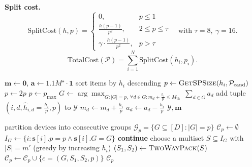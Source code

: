 \vspace{0.5em}
\noindent\textbf{Split cost.}
\[
\mathrm{SplitCost}(h,p)=
\begin{cases}
0, & p\le 1\\
\frac{h(p-1)}{p^2}, & 2\le p\le \tau\\
\gamma\cdot\frac{h(p-1)}{p^2}, & p>\tau
\end{cases}
\quad\text{with }\tau=8,\ \gamma=16.
\]
\[
\mathrm{TotalCost}(\mathcal{P})=\sum_{i=1}^N \mathrm{SplitCost}(h_i,p_i).
\]
\begin{algorithm}
\caption{FlexUlysses Sub-procedures}
\label{alg:subprocedures}
\begin{algorithmic}[1]
\State $\mathbf{m}\gets \mathbf{0}$, \quad $\mathbf{a}\gets 1.1 M^\star\cdot \mathbf{1}$ 
\State sort items by $h_i$ descending
  \State $p \gets \Call{GetSPSize}{h_i,\mathcal{P}_{\mathrm{cand}}}$ 
    \State $p \gets 2p$
  \EndWhile
   \State $p\gets p_{\max}$ \EndIf
  \State $G \gets \arg\max_{G:|G|=p,\ \forall d\in G: m_d+\frac{h_i}{p}\le M_{\mathrm{th}}}\ \sum_{d\in G} a_d$
    \State add tuple $(i,d,\hat h_{i,d}\!=\!\frac{h_i}{p},p)$ to $\mathcal{Y}$
    \State $m_d \gets m_d + \frac{h_i}{p}$
    \State $a_d \gets a_d - \frac{h_i}{p}$ 
  \EndFor
\EndFor
\State \Return $\mathcal{Y},\mathbf{m}$
\EndProcedure

\vspace{0.3em}
\Statex
{}
\State partition devices into consecutive groups $\mathcal{G}_p=\{G\subseteq [D]: |G|=p\}$
\State $\mathcal{C}_p\gets \emptyset$
  \State $I_G \gets \{i:\mathbf{s}[i].p=p \wedge \mathbf{s}[i].G=G\}$
   \State \textbf{continue} \EndIf
    \State choose a multiset $S\subseteq I_G$ with $|S|=m'$ (greedy by increasing $h_i$)
    \State $(S_1,S_2)\gets \Call{TwoWayPack}{S}$ 
      \State $\mathcal{C}_p \gets \mathcal{C}_p \cup \{c=(G,S_1,S_2,p)\}$
    \EndIf
  \EndFor
\EndFor
\State \Return $\mathcal{C}_p$
\EndProcedure


\end{algorithmic}
\end{algorithm}
